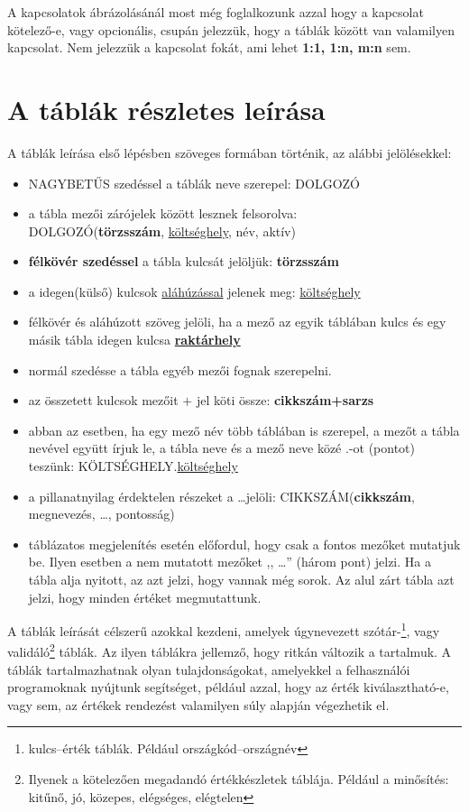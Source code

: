 \documentclass[a4paper,12pt]{report}
\newcommand{\pk}[1]{\textbf{#1}} %
\newcommand{\fk}[1]{\underline{#1}} %
\newcommand{\tabla}[1]{\noindent\MakeUppercase{#1}} %
\newcommand{\tmezo}[2]{\MakeUppercase{#1}.{\underline{#2}}} %
\begin{document}
A kapcsolatok ábrázolásánál most még foglalkozunk azzal hogy a kapcsolat 
kötelező-e, vagy opcionális, csupán jelezzük, hogy a táblák között van 
valamilyen kapcsolat. Nem jelezzük a kapcsolat fokát, ami lehet \textbf{1:1, 
1:n, m:n} sem.

\section{A táblák részletes leírása}
A táblák leírása első lépésben szöveges formában történik, az alábbi 
jelölésekkel:
\begin{itemize}
 \item \tabla{nagybetűs} szedéssel a táblák neve szerepel: \tabla{dolgozó}
 \item a tábla mezői zárójelek között lesznek felsorolva:\\ 
 \tabla{DOLGOZÓ}(\pk{törzsszám}, \fk{költséghely}, név, aktív)
 \item \pk{félkövér szedéssel} a tábla kulcsát jelöljük: \pk{törzsszám}
 \item a idegen(külső) kulcsok \fk{aláhúzással} jelenek meg: 
 \fk{költséghely}
 \item félkövér és aláhúzott szöveg jelöli, ha a mező az egyik táblában kulcs 
és egy másik tábla idegen kulcsa \pk{\fk{raktárhely}} 
\item normál szedésse a tábla egyéb mezői fognak szerepelni.
\item az összetett kulcsok mezőit $+$ jel köti össze: \pk{cikkszám+sarzs}
\item abban az esetben, ha egy mező név több táblában is szerepel, a mezőt 
a tábla nevével együtt írjuk le, a tábla neve és a mező neve közé .-ot 
(pontot) teszünk: \tmezo{KÖLTSÉGHELY}{költséghely}
\item a pillanatnyilag érdektelen részeket a \dots jelöli:
\tabla{cikkszám}(\pk{cikkszám}, megnevezés, \dots, pontosság)
\item táblázatos megjelenítés esetén előfordul, hogy csak a fontos mezőket 
mutatjuk be. Ilyen esetben a nem mutatott mezőket ,, \dots  '' (három pont) 
jelzi. Ha a tábla alja nyitott, az azt jelzi, hogy vannak még sorok. Az 
alul zárt tábla azt jelzi, hogy minden értéket megmutattunk.
\end{itemize}

A táblák leírását célszerű azokkal kezdeni, amelyek úgynevezett 
szótár-\footnote{kulcs--érték táblák. Például országkód--országnév}, vagy
validáló\footnote{Ilyenek a kötelezően megadandó értékkészletek táblája. 
Például a minősítés: kitűnő, jó, közepes, elégséges, elégtelen} táblák.
Az ilyen táblákra jellemző, hogy ritkán változik a tartalmuk. A táblák 
tartalmazhatnak olyan tulajdonságokat, amelyekkel a felhasználói
programoknak nyújtunk segítséget, például azzal, hogy az érték
kiválasztható-e, vagy sem, az értékek rendezést valamilyen súly alapján 
végezhetik el.
\end{document}
